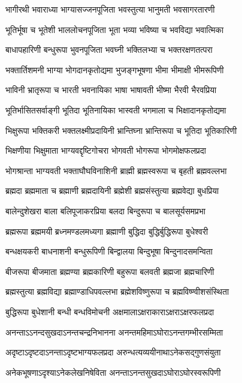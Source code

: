 \twolineshloka
{भागीरथी भवाराध्या भाग्यासज्जनपूजिता}
{भवस्तुत्या भानुमती भवसागरतारणी}%

\twolineshloka
{भूतिर्भूषा च भूतेशी भाललोचनपूजिता}
{भूता भव्या भविष्या च भवविद्या भवात्मिका}%

\twolineshloka
{बाधापहारिणी बन्धुरूपा भुवनपूजिता}
{भवघ्नी भक्तिलभ्या च भक्तरक्षणतत्परा}%

\twolineshloka
{भक्तार्तिशमनी भाग्या भोगदानकृतोद्यमा}
{भुजङ्गभूषणा भीमा भीमाक्षी भीमरूपिणी}%

\twolineshloka
{भाविनी भ्रातृरूपा च भारती भवनायिका}
{भाषा भाषावती भीष्मा भैरवी भैरवप्रिया}%

\twolineshloka
{भूतिर्भासितसर्वाङ्गी भूतिदा भूतिनायिका}
{भास्वती भगमाला च भिक्षादानकृतोद्यमा}%

\twolineshloka
{भिक्षुरूपा भक्तिकरी भक्तलक्ष्मीप्रदायिनी}
{भ्रान्तिघ्ना भ्रान्तिरूपा च भूतिदा भूतिकारिणी}%

\twolineshloka
{भिक्षणीया भिक्षुमाता भाग्यवद्दृष्टिगोचरा}
{भोगवती भोगरूपा भोगमोक्षफलप्रदा}%

\twolineshloka
{भोगश्रान्ता भाग्यवती भक्ताघौघविनाशिनी}
{ब्राह्मी ब्रह्मस्वरूपा च बृहती ब्रह्मवल्लभा}%

\twolineshloka
{ब्रह्मदा ब्रह्ममाता च ब्रह्माणी ब्रह्मदायिनी}
{ब्रह्मेशी ब्रह्मसंस्तुत्या ब्रह्मवेद्या बुधप्रिया}%

\twolineshloka
{बालेन्दुशेखरा बाला बलिपूजाकरप्रिया}
{बलदा बिन्दुरूपा च बालसूर्यसमप्रभा}%

\twolineshloka
{ब्रह्मरूपा ब्रह्ममयी ब्रध्नमण्डलमध्यगा}
{ब्रह्माणी बुद्धिदा बुद्धिर्बुद्धिरूपा बुधेश्वरी}%

\twolineshloka
{बन्धक्षयकरी बाधनाशनी बन्धुरूपिणी}
{बिन्द्वालया बिन्दुभूषा बिन्दुनादसमन्विता}%

\twolineshloka
{बीजरूपा बीजमाता ब्रह्मण्या ब्रह्मकारिणी}
{बहुरूपा बलवती ब्रह्मजा ब्रह्मचारिणी}%

\twolineshloka
{ब्रह्मस्तुत्या ब्रह्मविद्या ब्रह्माण्डाधिपवल्लभा}
{ब्रह्मेशविष्णुरूपा च ब्रह्मविष्ण्वीशसंस्थिता}%

\twolineshloka
{बुद्धिरूपा बुधेशानी बन्धी बन्धविमोचनी}
{अक्षमालाऽक्षराकाराऽक्षराऽक्षरफलप्रदा}%

\twolineshloka
{अनन्ताऽऽनन्दसुखदाऽनन्तचन्द्रनिभानना}
{अनन्तमहिमाऽघोराऽनन्तगम्भीरसम्मिता}%

\twolineshloka
{अदृष्टाऽदृष्टदाऽनन्ताऽदृष्टभाग्यफलप्रदा}
{अरुन्धत्यव्ययीनाथाऽनेकसद्गुणसंयुता}%

\twolineshloka
{अनेकभूषणाऽदृश्याऽनेकलेखनिषेविता}
{अनन्ताऽनन्तसुखदाऽघोराऽघोरस्वरूपिणी}%

